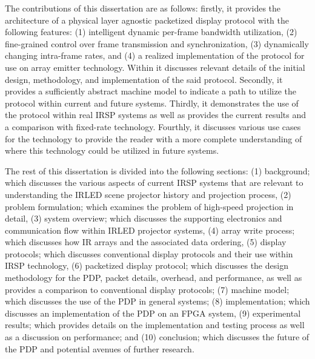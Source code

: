 The contributions of this dissertation are as follows: firstly, it provides the architecture of a physical layer agnostic packetized display protocol with the following features: (1) intelligent dynamic per-frame bandwidth utilization, (2) fine-grained control over frame transmission and synchronization, (3) dynamically changing intra-frame rates, and (4) a realized implementation of the protocol for use on array emitter technology. Within it discusses relevant details of the initial design, methodology, and implementation of the said protocol. Secondly, it provides a sufficiently abstract machine model to indicate a path to utilize the protocol within current and future systems. Thirdly, it demonstrates the use of the protocol within real IRSP systems as well as provides the current results and a comparison with fixed-rate technology. Fourthly, it discusses various use cases for the technology to provide the reader with a more complete understanding of where this technology could be utilized in future systems.

The rest of this dissertation is divided into the following sections: (1) background; which discusses the various aspects of current IRSP systems that are relevant to understanding the IRLED scene projector history and projection process, (2) problem formulation; which examines the problem of high-speed projection in detail, (3) system overview; which discusses the supporting electronics and communication flow within IRLED projector systems, (4) array write process; which discusses how IR arrays and the associated data ordering, (5) display protocols; which discusses conventional display protocols and their use within IRSP technology, (6) packetized display protocol; which discusses the design methodology for the PDP, packet details, overhead, and performance, as well as provides a comparison to conventional display protocols; (7) machine model; which discusses the use of the PDP in general systems; (8) implementation; which discusses an implementation of the PDP on an FPGA system, (9) experimental results; which provides details on the implementation and testing process as well as a discussion on performance; and (10) conclusion; which discusses the future of the PDP and potential avenues of further research.

